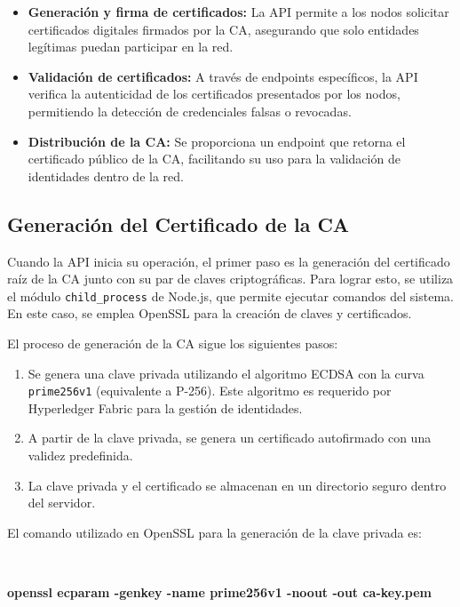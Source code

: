 \begin{itemize}
    \item \textbf{Generación y firma de certificados:} La API permite a los nodos solicitar certificados digitales firmados por la CA, asegurando que solo entidades legítimas puedan participar en la red.
    \item \textbf{Validación de certificados:} A través de endpoints específicos, la API verifica la autenticidad de los certificados presentados por los nodos, permitiendo la detección de credenciales falsas o revocadas.
    \item \textbf{Distribución de la CA:} Se proporciona un endpoint que retorna el certificado público de la CA, facilitando su uso para la validación de identidades dentro de la red.
\end{itemize}

\subsection{Generación del Certificado de la CA}

Cuando la API inicia su operación, el primer paso es la generación del certificado raíz de la CA junto con su par de claves criptográficas. Para lograr esto, se utiliza el módulo \texttt{child\_process} de Node.js\cite{nodejs}, que permite ejecutar comandos del sistema. En este caso, se emplea OpenSSL\cite{openssl} para la creación de claves y certificados.

El proceso de generación de la CA sigue los siguientes pasos:

\begin{enumerate}
    \item Se genera una clave privada utilizando el algoritmo ECDSA\cite{ecdsa} con la curva \texttt{prime256v1} (equivalente a P-256). Este algoritmo es requerido por Hyperledger Fabric para la gestión de identidades.
    \item A partir de la clave privada, se genera un certificado autofirmado con una validez predefinida.
    \item La clave privada y el certificado se almacenan en un directorio seguro dentro del servidor.
\end{enumerate}

El comando utilizado en OpenSSL para la generación de la clave privada es:

\

\small{\textbf{openssl ecparam -genkey -name prime256v1 -noout -out ca-key.pem}}

